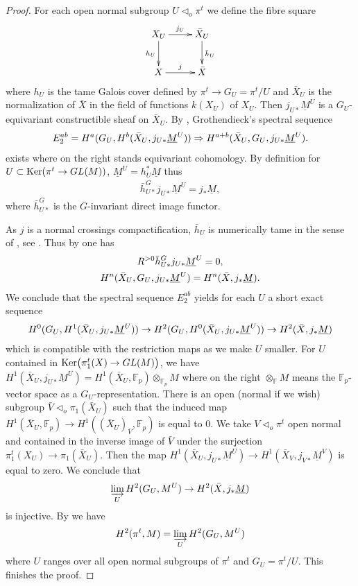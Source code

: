 \documentclass[12pt]{amsart}
\theoremstyle{plain}
\theoremstyle{definition}
\numberwithin{thm}{section}
\newcommand{\ga}[2]{\begin{gather}\label{#1}#2 \end{gather}}
\newcommand{\F}{{\mathbb F}}
\numberwithin{equation}{section}
\begin{document}
\begin{proof}
For each open normal  subgroup $U \lhd_o \pi^t$
we define the fibre square
\ga{}{\xymatrix{ \ar[d]_{h_U} X_U \ar[r]^{j_U} & \bar X_U \ar[d]^{\bar h_U}\\
X\ar[r]^j& \bar X
} \notag}
where $h_U$ is the tame Galois cover defined by $\pi^t\to G_U=\pi^t/U$ and $\bar X_U$ is the normalization of $\bar X$ in the field of functions $k(X_U)$ of $X_U$. 
 Then $j_{U*} \underline{M}^U$ is a $G_U$-equivariant constructible sheaf on $\bar X_U$.  By \cite[Theorem]{Suw79}, Grothendieck's spectral sequence \cite[Th\'eor\`eme~5.2.1]{Gro57} 
\ga{}{E_2^{ab}=H^a(G_U, H^b(\bar X_U,j_{U*} \underline{M}^U)) \Rightarrow 
H^{a+b}(\bar X_U, G_U, j_{U*} \underline{M}^U).\notag
 }
exists where on the right stands equivariant cohomology.  By definition for $U\subset {\rm Ker}( \pi^t\to GL(M))$,  $\underline{M}^U= h_U^*\underline{M}$ thus
\ga{a}{ \bar h^G_{U*} j_{U*} \underline{M}^U=j_* \underline{M}, }
 where $\bar h^G_{U*}$ is the $G$-invariant direct image functor.

As $j$ is a normal crossings compactification, $\bar h_U$ is numerically tame in the sense of \cite[Section~5]{KS10}, see \cite[Theorem~5.4 (a)]{KS10}.  
Thus by \cite[Corollaire p.204]{Gro57} one has 
\ga{b}{ R^{>0}   \bar h^G_{U*} j_{U*} \underline{M}^U=0 , \\
H^{n}(\bar X_U, G_U, j_{U*} \underline{M}^U)=H^n(\bar X, j_*\underline{M}). \notag
}
We conclude that the spectral sequence $E_2^{ab}$ yields for each $U$ a short exact sequence 
\ga{seq}{ H^0(G_U, H^1(\bar X_U, j_{U*} \underline{M}^U)) \to H^2(G_U, H^0(\bar X_U,j_{U*} \underline{M}^U)) \to H^2(\bar X, j_*\underline{M})\notag}
which is compatible with the restriction maps as we make $U$ smaller.
For $U$ contained in ${\rm Ker} \big(\pi_1^t(X)\to GL(M)\big)$, we have 
$H^1(\bar X_U, j_{U*} \underline{M}^U)=H^1(\bar X_U, \F_p)\otimes_{\F_p} M$ where on the right $\otimes_{\F}M$ means the $\F_p$-vector space as a $G_U$-representation.  There is an open (normal if we wish) subgroup $\bar V \lhd_o \pi_1(\bar X_U)$ such that the induced map $H^1(\bar X_U, \F_p) \to 
H^1((\bar X_U)_{\bar V}, \F_p)$ is equal to $0$. We take  $V\lhd_o \pi^t$ open normal  and contained in the inverse image of $\bar V$ under the surjection $\pi_1^t(X_U)\to \pi_1(\bar X_U)$.  Then the map 
$H^1(\bar X_U, j_{U*} \underline{M}^U)\to H^1(\bar X_V, j_{V*} \underline{M}^V)$ is equal to zero. 
 We conclude that 
\ga{}{ \varinjlim_U H^2(G_U, M^U)\to H^2(\bar X, j_*\underline{M}) \notag}
is injective. 
By \cite[Proposition~1.2.5] {NSW13} we have 
\ga{2}{ H^2(\pi^t, M)=\varinjlim_U H^2(G_U, M^U) \notag}
where $U$ ranges over all open normal subgroups of $\pi^t$ and $G_U=\pi^t/U$. This finishes the proof. 





\end{proof}
\end{document}
